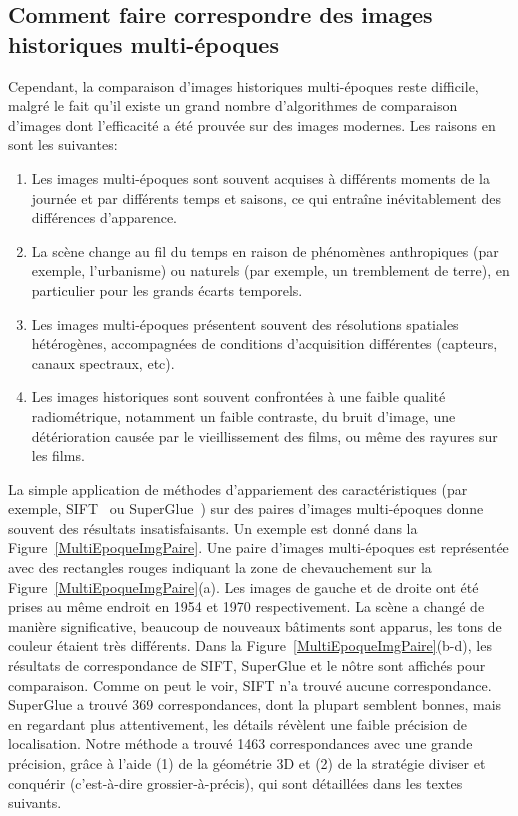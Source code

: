 \subsection{Comment faire correspondre des images historiques multi-époques}
Cependant, la comparaison d'images historiques multi-époques reste difficile, malgré le fait qu'il existe un grand nombre d'algorithmes de comparaison d'images dont l'efficacité a été prouvée sur des images modernes. Les raisons en sont les suivantes:\\
\begin{enumerate}
	\item Les images multi-époques sont souvent acquises à différents moments de la journée et par différents temps et saisons, ce qui entraîne inévitablement des différences d'apparence.
	\item La scène change au fil du temps en raison de phénomènes anthropiques (par exemple, l'urbanisme) ou naturels (par exemple, un tremblement de terre), en particulier pour les grands écarts temporels.
	\item Les images multi-époques présentent souvent des résolutions spatiales hétérogènes, accompagnées de conditions d'acquisition différentes (capteurs, canaux spectraux, etc).
	\item Les images historiques sont souvent confrontées à une faible qualité radiométrique, notamment un faible contraste, du bruit d'image, une détérioration causée par le vieillissement des films, ou même des rayures sur les films.
\end{enumerate}
La simple application de méthodes d'appariement des caractéristiques (par exemple, SIFT~\cite{lowe2004distinctive} ou SuperGlue~\cite{sarlin2020superglue}) sur des paires d'images multi-époques donne souvent des résultats insatisfaisants. Un exemple est donné dans la Figure~\ref{MultiEpoqueImgPaire}. Une paire d'images multi-époques est représentée avec des rectangles rouges indiquant la zone de chevauchement sur la Figure~\ref{MultiEpoqueImgPaire}(a). Les images de gauche et de droite ont été prises au même endroit en 1954 et 1970 respectivement. La scène a changé de manière significative, beaucoup de nouveaux bâtiments sont apparus, les tons de couleur étaient très différents. Dans la Figure~\ref{MultiEpoqueImgPaire}(b-d), les résultats de correspondance de SIFT, SuperGlue et le nôtre sont affichés pour comparaison. Comme on peut le voir, SIFT n'a trouvé aucune correspondance. SuperGlue a trouvé 369 correspondances, dont la plupart semblent bonnes, mais en regardant plus attentivement, les détails révèlent une faible précision de localisation. Notre méthode a trouvé 1463 correspondances avec une grande précision, grâce à l'aide (1) de la géométrie 3D et (2) de la stratégie diviser et conquérir (c'est-à-dire grossier-à-précis), qui sont détaillées dans les textes suivants.
